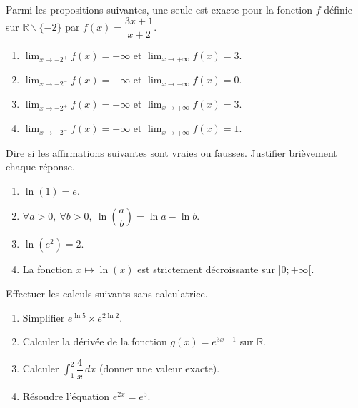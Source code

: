 \documentclass[11pt]{article}
\def\setminus{\mathbin{\backslash}}\let\smallsetminus\setminus
\begin{document}
\begin{exercice}
Parmi les propositions suivantes, une seule est exacte pour la fonction $f$ définie sur $\mathbb{R}\setminus\{-2\}$ par $f(x)=\dfrac{3x+1}{x+2}$.
\begin{enumerate}
    \item $\displaystyle\lim_{x\to -2^+} f(x) = -\infty$ et $\displaystyle\lim_{x\to +\infty} f(x) = 3$.
    \item $\displaystyle\lim_{x\to -2^-} f(x) = +\infty$ et $\displaystyle\lim_{x\to -\infty} f(x) = 0$.
    \item $\displaystyle\lim_{x\to -2^+} f(x) = +\infty$ et $\displaystyle\lim_{x\to +\infty} f(x) = 3$.
    \item $\displaystyle\lim_{x\to -2^-} f(x) = -\infty$ et $\displaystyle\lim_{x\to +\infty} f(x) = 1$.
\end{enumerate}
\end{exercice}

\begin{exercice}
Dire si les affirmations suivantes sont vraies ou fausses. Justifier brièvement chaque réponse.
\begin{enumerate}
    \item $\ln(1) = e$.
    \item $\forall a>0,\ \forall b>0,\ \ln\left(\dfrac{a}{b}\right) = \ln a - \ln b$.
    \item $\ln(e^2) = 2$.
    \item La fonction $x \mapsto \ln(x)$ est strictement décroissante sur $]0;+\infty[$.
\end{enumerate}
\end{exercice}

\begin{exercice}
Effectuer les calculs suivants sans calculatrice.
\begin{enumerate}
    \item Simplifier $e^{\ln 5} \times e^{2\ln 2}$.
    \item Calculer la dérivée de la fonction $g(x) = e^{3x-1}$ sur $\mathbb{R}$.
    \item Calculer $\displaystyle\int_1^2 \dfrac{4}{x}\,dx$ (donner une valeur exacte).
    \item Résoudre l'équation $e^{2x} = e^5$.
\end{enumerate}
\end{exercice}
\end{document}
